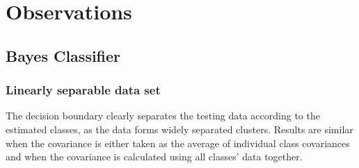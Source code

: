 \documentclass[a4paper]{article}
\begin{document}
\vspace{1.0cm}


\section{Observations}
	\subsection{Bayes Classifier} 
		\subsubsection{Linearly separable data set}
			The decision boundary clearly separates the testing data according to the
			estimated classes, as the data forms widely separated clusters.
			Results are similar when the covariance is either taken as the average of
			individual class covariances and when the covariance is calculated using all
			classes' data together.
			
			
\end{document}
